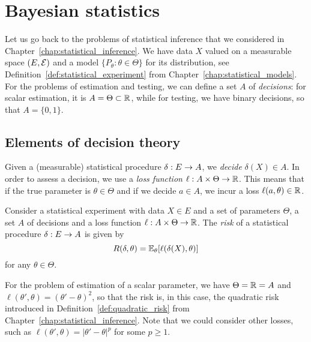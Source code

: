 \setchapterpreamble[u]{\margintoc}
\chapter{Bayesian statistics}
\label{chap:bayesian_statistics}

Let us go back to the problems of statistical inference that we considered in Chapter~\ref{chap:statistical_inference}.
We have data $X$ valued on a measurable space $(E, \operatorname{{\mathcal E}})$ and a model $\{ P_\theta : \theta \in \Theta\}$ for its distribution, see Definition~\ref{def:statistical_experiment} from Chapter~\ref{chap:statistical_models}.
For the problems of estimation and testing, we can define a set $A$ of \emph{decisions}: for scalar estimation, it is $A = \Theta \subset \mathbb R$, while for testing, we have binary decisions, so that $A = \{ 0, 1 \}$.

\section{Elements of decision theory} %
\label{sec:elements_of_decision_theory}

Given a (measurable) statistical procedure $\delta : E \rightarrow A$, we \emph{decide} $\delta(X) \in A$.
In order to assess a decision, we use a \emph{loss function} $\ell : A \times \Theta \rightarrow \mathbb R$.
This means that if the true parameter is $\theta \in \Theta$ and if we decide $a \in A$, we incur a loss $\ell(a, \theta) \in \mathbb R$.

\begin{definition}
	Consider a statistical experiment with data $X \in E$ and a set of parameters $\Theta$, a set $A$ of decisions and a loss function $\ell : A \times \Theta \rightarrow \mathbb R$. The \emph{risk} of a statistical procedure $\delta : E \rightarrow A$ is given by
	\begin{equation*}
		R(\delta, \theta) = \mathbb E_\theta[ \ell(\delta(X), \theta)]
	\end{equation*}
	for any $\theta \in \Theta$.
\end{definition}

For the problem of estimation of a scalar parameter, we have $\Theta = \mathbb R = A$ and $\ell(\theta', \theta) = (\theta' - \theta)^2$, so that the risk is, in this case, the quadratic risk introduced in Definition~\ref{def:quadratic_risk} from Chapter~\ref{chap:statistical_inference}.
Note that we could consider other losses, such as $\ell(\theta', \theta) = |\theta' - \theta|^p$ for some $p \geq 1$.


